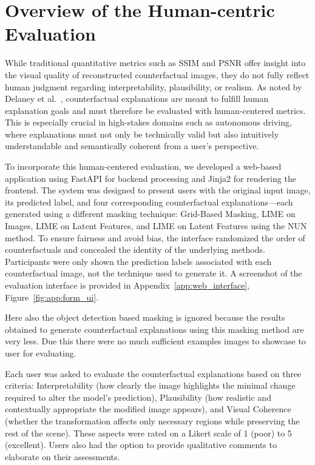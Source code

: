 \clearpage

\section{Overview of the Human-centric Evaluation} \label{sec:human_evluation}

While traditional quantitative metrics such as SSIM and PSNR offer insight into the visual quality of reconstructed counterfactual images, they do not fully reflect human judgment regarding interpretability, plausibility, or realism. As noted by Delaney et al.~\cite{DELANEY2023103995}, counterfactual explanations are meant to fulfill human explanation goals and must therefore be evaluated with human-centered metrics. This is especially crucial in high-stakes domains such as autonomous driving, where explanations must not only be technically valid but also intuitively understandable and semantically coherent from a user's perspective.

To incorporate this human-centered evaluation, we developed a web-based application using FastAPI for backend processing and Jinja2 for rendering the frontend. The system was designed to present users with the original input image, its predicted label, and four corresponding counterfactual explanations—each generated using a different masking technique: Grid-Based Masking, LIME on Images, LIME on Latent Features, and LIME on Latent Features using the NUN method. To ensure fairness and avoid bias, the interface randomized the order of counterfactuals and concealed the identity of the underlying methods. Participants were only shown the prediction labels associated with each counterfactual image, not the technique used to generate it. A screenshot of the evaluation interface is provided in Appendix~\ref{app:web_interface}, Figure~\ref{fig:app:form_ui}.

Here also the object detection based masking is ignored because the results obtained to generate counterfactual explanations using this masking method are very less. Due this there were no much sufficient examples images to showcase to user for evaluating.

Each user was asked to evaluate the counterfactual explanations based on three criteria: Interpretability (how clearly the image highlights the minimal change required to alter the model’s prediction), Plausibility (how realistic and contextually appropriate the modified image appears), and Visual Coherence (whether the transformation affects only necessary regions while preserving the rest of the scene). These aspects were rated on a Likert scale of 1 (poor) to 5 (excellent). Users also had the option to provide qualitative comments to elaborate on their assessments.

